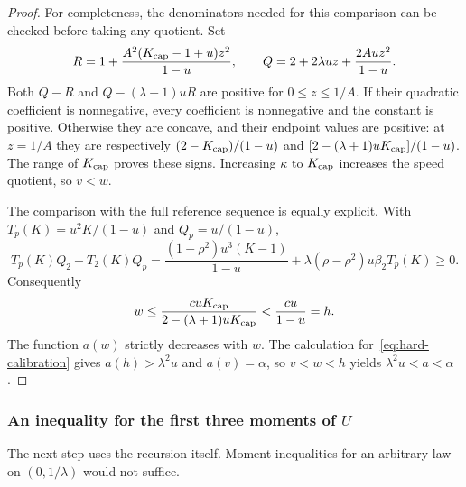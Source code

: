 \begin{proof}
For completeness, the denominators needed for this comparison can be checked before taking any quotient. Set
\[
 R=1+\frac{A^2(K_{\rm cap}-1+u)z^2}{1-u},\qquad
 Q=2+2\lambda uz+\frac{2Auz^2}{1-u}.
\]
Both $Q-R$ and $Q-(\lambda+1)uR$ are positive for $0\le z\le1/A$. If their quadratic coefficient is nonnegative, every coefficient is nonnegative and the constant is positive. Otherwise they are concave, and their endpoint values are positive: at $z=1/A$ they are respectively $(2-K_{\rm cap})/(1-u)$ and $[2-(\lambda+1)uK_{\rm cap}]/(1-u)$. The range of $K_{\rm cap}$ proves these signs. Increasing $\kappa$ to $K_{\rm cap}$ increases the speed quotient, so $v<w$.

The comparison with the full reference sequence is equally explicit. With $T_p(K)=u^2K/(1-u)$ and $Q_p=u/(1-u)$,
\[
 T_p(K)Q_2-T_2(K)Q_p
 =\frac{(1-\rho^2)u^3(K-1)}{1-u}
   +\lambda(\rho-\rho^2)u\beta_2T_p(K)\ge0.
\]
Consequently
\[
 w\le\frac{cuK_{\rm cap}}{2-(\lambda+1)uK_{\rm cap}}<\frac{cu}{1-u}=h.
\]
The function $a(w)$ strictly decreases with $w$. The calculation for~\eqref{eq:hard-calibration} gives $a(h)>\lambda^2u$ and $a(v)=\alpha$, so $v<w<h$ yields $\lambda^2u<a<\alpha$.
\end{proof}

\subsubsection{An inequality for the first three moments of \texorpdfstring{$U$}{U}}
The next step uses the recursion itself. Moment inequalities for an arbitrary law on $(0,1/\lambda)$ would not suffice.

